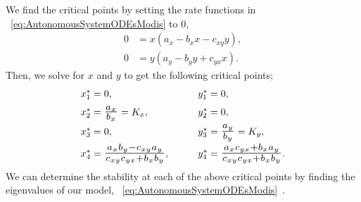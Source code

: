 We find the critical points by setting the rate functions in \equationautorefname~\eqref{eq:AutonomousSystemODEsModis} to 0,
\begin{equation*}
    \begin{aligned}
    0 &= x(a_x - b_xx - c_{xy}y),\\
    0 &= y(a_y - b_yy + c_{yx}x).
    \end{aligned}
\end{equation*}
Then, we solve for $x$ and $y$ to get the following critical points;
\begin{equation*}
    \begin{array}{llll}
         x^*_1 = 0, &&& y^*_1 = 0,  \\[.2cm]
         x^*_2 = \scalebox{1.3}{$\frac{a_x}{b_x}$}= K_x,&&& y^*_2 = 0,\\[.2cm]
         x^*_3 = 0, &&& y^*_3 = \scalebox{1.3}{$\frac{a_y}{b_y}$}=K_y,\\[.2cm]
         x^*_4 = \scalebox{1.3}{$\frac{a_xb_y-c_{xy}a_y}{c_{xy}c_{yx}+b_xb_y}$}, &&& y^*_4 = \scalebox{1.3}{$\frac{a_xc_{yx}+b_xa_y}{c_{xy}c_{yx}+b_xb_y}$}.
    \end{array}
\end{equation*}
We can determine the stability at each of the above critical points by finding the eigenvalues of our model, \equationautorefname~\eqref{eq:AutonomousSystemODEsModis}~\cite{roussel2019stability}.
